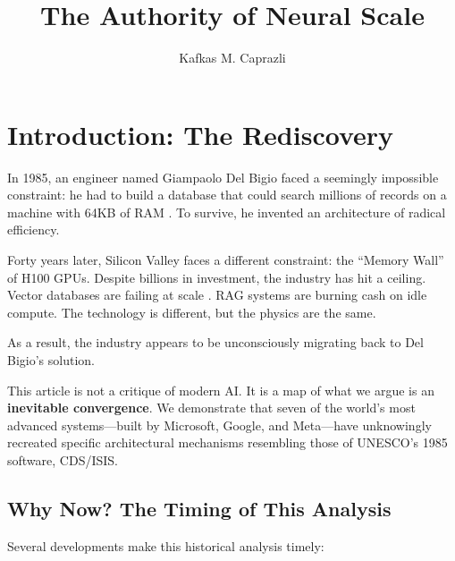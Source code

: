 \documentclass[manuscript,screen,nonacm]{acmart}
\title{The Authority of Neural Scale}
\author{Kafkas M. Caprazli}
\affiliation{%
  \institution{Independent Researcher}
  \city{Wolfsburg}
  \country{Germany}
}
\begin{document}
\maketitle

\section{Introduction: The Rediscovery}

In 1985, an engineer named Giampaolo Del Bigio faced a seemingly impossible constraint: he had to build a database that could search millions of records on a machine with 64KB of RAM \cite{delbigio1995}. To survive, he invented an architecture of radical efficiency.

Forty years later, Silicon Valley faces a different constraint: the ``Memory Wall'' of H100 GPUs. Despite billions in investment, the industry has hit a ceiling. Vector databases are failing at scale \cite{bruckhaus2024}. RAG systems are burning cash on idle compute. The technology is different, but the physics are the same.

As a result, the industry appears to be unconsciously migrating back to Del Bigio's solution.

This article is not a critique of modern AI. It is a map of what we argue is an \textbf{inevitable convergence}. We demonstrate that seven of the world's most advanced systems---built by Microsoft, Google, and Meta---have unknowingly recreated specific architectural mechanisms resembling those of UNESCO's 1985 software, CDS/ISIS.

\subsection{Why Now? The Timing of This Analysis}

Several developments make this historical analysis timely:
\end{document}
